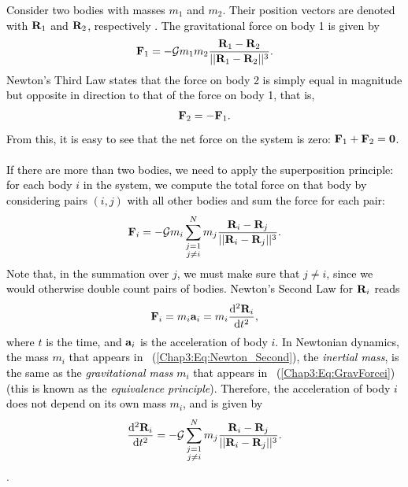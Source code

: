 \documentclass[main.tex]{subfiles}
\begin{document}
\begin{tcolorbox}[sharp corners, colback=blue!30, colframe=blue!80!blue, title=Box \refstepcounter{educhap3}\label{boxchap3:dynII}\ref{boxchap3:dynII} -- Orbital Dynamics II]
\par \textcolor{black}{Consider two bodies with masses $m_1$ and $m_2$. Their position vectors are denoted with ${\mathbf{R}}_1$ and ${\mathbf{R}}_2$, respectively . The gravitational force on body 1 is given by
\begin{align}
\label{Chap3:Eq:F_1_vec}
{\mathbf{F}}_{1} = - \mathcal{G} m_1m_2 \frac{{\mathbf{R}}_1 - {\mathbf{R}}_2}{|| {\mathbf{R}}_1 - {\mathbf{R}}_2||^3}.
\end{align}
 Newton's Third Law states that the force on body 2 is simply equal in magnitude but opposite in direction to that of the force on body 1, that is,
\begin{align}
{\mathbf{F}}_{2} = - {\mathbf{F}}_{1}.
\end{align}
From this, it is easy to see that the net force on the system is zero: ${\mathbf{F}}_1 + {\mathbf{F}}_2 = {\mathbf{0}}$. \\ \\
If there are more than two bodies, we need to apply the superposition principle: for each body $i$ in the system, we compute the total force on that body by considering pairs $(i,j)$ with all other bodies and sum the force for each pair:
\begin{align}
\label{Chap3:Eq:GravForcei}
{\mathbf{F}}_i = -\mathcal{G} m_i \sum_{\substack{j=1 \\ j\neq i}}^{N} m_j \frac{ {\mathbf{R}}_i - {\mathbf{R}}_j}{|| {\mathbf{R}}_i - {\mathbf{R}}_j||^3}.
\end{align}
Note that, in the summation over $j$, we must make sure that $j\neq i$, since we would otherwise double count pairs of bodies. Newton's Second Law for ${\mathbf{R}}_i$ reads
\begin{align}
\label{Chap3:Eq:Newton_Second}
{\mathbf{F}}_i = m_i {\mathbf{a}}_i = m_i \frac{\mathrm{d}^2 {\mathbf{R}}_i}{\mathrm{d} t^2},
\end{align}
where $t$ is the time, and ${\mathbf{a}}_i$ is the acceleration of body $i$. In Newtonian dynamics, the mass $m_i$ that appears in \Eq~(\ref{Chap3:Eq:Newton_Second}), the {\it inertial mass}, is the same as the {\it gravitational mass} $m_i$ that appears in \Eq~(\ref{Chap3:Eq:GravForcei}) (this is known as the {\it equivalence principle}). Therefore, the acceleration of body $i$ does not depend on its own mass $m_i$, and is given by
\begin{align}
\label{Chap3:Eq:EOM}
\frac{\mathrm{d}^2 {\mathbf{R}}_i}{\mathrm{d} t^2} = - \mathcal{G} \sum_{\substack{j=1 \\ j\neq i}}^{N} m_j \frac{ {\mathbf{R}}_i - {\mathbf{R}}_j}{|| {\mathbf{R}}_i - {\mathbf{R}}_j||^3}.
\end{align}
}.  
\end{tcolorbox}
\end{document}
